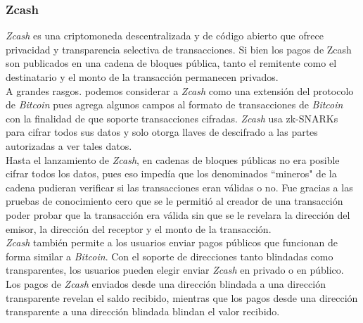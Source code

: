 \documentclass[oneside,10pt]{article}
\begin{document}
\subsubsection{Zcash}
\emph{Zcash} es una criptomoneda descentralizada y de código abierto que ofrece privacidad y transparencia selectiva de transacciones. Si bien los pagos de Zcash son publicados en una cadena de bloques pública, tanto el remitente como el destinatario y el monto de la transacción permanecen privados. \\
A grandes rasgos. podemos considerar a \emph{Zcash} como una extensión del protocolo de \emph{Bitcoin} pues agrega algunos campos al formato de transacciones de \emph{Bitcoin} con la finalidad de que soporte transacciones cifradas. \emph{Zcash} usa zk-SNARKs para cifrar todos sus datos y solo otorga llaves de descifrado a las partes autorizadas a ver tales datos. \\
Hasta el lanzamiento de \emph{Zcash}, en cadenas de bloques públicas no era posible cifrar todos los datos, pues eso impedía que los denominados ``mineros" de la cadena pudieran verificar si las transacciones eran válidas o no. Fue gracias a las pruebas de conocimiento cero que se le permitió al creador de una transacción poder probar que la transacción era válida sin que se le revelara la dirección del emisor, la dirección del receptor y el monto de la transacción.\\
\emph{Zcash} también permite a los usuarios enviar pagos públicos que funcionan de forma similar a \emph{Bitcoin}. Con el soporte de direcciones tanto blindadas como transparentes, los usuarios pueden elegir enviar \emph{Zcash} en privado o en público. Los pagos de \emph{Zcash} enviados desde una dirección blindada a una dirección transparente revelan el saldo recibido, mientras que los pagos desde una dirección transparente a una dirección blindada blindan el valor recibido.
\end{document}
